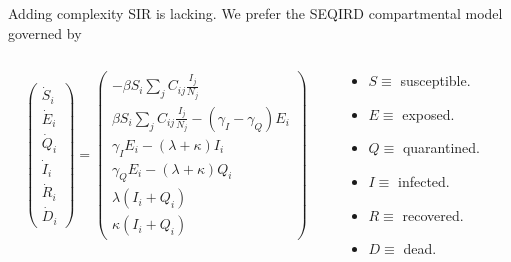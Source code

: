 \documentclass[aspectratio=169]{beamer}
\begin{document}
\begin{frame}{Adding complexity}
\vfill
SIR is lacking.  We prefer the SEQIRD compartmental model governed by
\begin{columns}
\begin{column}{0.5\textwidth}
\[
\begin{pmatrix} \dot{S}_i \\ \dot{E}_i \\ \dot{Q}_i \\ \dot{I}_i \\ \dot{R}_i \\ \dot{D}_i \end{pmatrix} = \begin{pmatrix} -\beta S_i \sum_j C_{ij} \frac{I_j}{N_j} \\ \beta S_i \sum_j C_{ij} \frac{I_j}{N_j} - (\gamma_I - \gamma_Q)E_i \\ \gamma_I E_i - (\lambda + \kappa)I_i \\ \gamma_Q E_i - (\lambda + \kappa) Q_i \\ \lambda(I_i + Q_i) \\ \kappa (I_i + Q_i) \end{pmatrix}
\]
\end{column}
\begin{column}{0.5\textwidth}
    \begin{itemize}
        \item $S \equiv $ susceptible.
        \item $E \equiv $ exposed.
        \item $Q \equiv $ quarantined.
        \item $I \equiv $ infected.
        \item $R \equiv $ recovered.
        \item $D \equiv $ dead.
    \end{itemize}
\end{column}
\end{columns}
\vfill
\end{frame}
\end{document}
